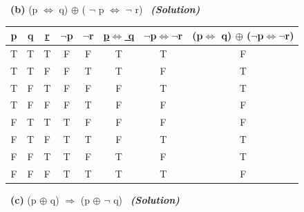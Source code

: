 \documentclass[a4 paper]{article}
\numberwithin{equation}{section}
\newcommand{\subproblem}[1]{~\newline\textbf{(#1)}}
\newcommand{\solution}{~\newline\textbf{\textit{(Solution)}} }
\newcommand{\0}{\mathbf{0}}
\begin{document}
\subproblem{b} (p $\iff$ q) $\oplus$ ( $\neg$ p $\iff$ $\neg$ r)
\solution 
\begin{table}[h!]
\begin{tabular}{cccccccc}
\textbf{p} & \textbf{q} & {\ul \textbf{r}} & \textbf{$\neg$p} & \textbf{$\neg$r} & {\ul \textbf{p$\iff$ q}} & \textbf{$\neg$p$\iff$$\neg$r} & \textbf{(p$\iff$ q) $\oplus$ ($\neg$p$\iff$$\neg$r)} \\ \hline
T          & T          & T                & F                & F                & T                        & T                             & F                                                  \\
T          & T          & F                & F                & T                & T                        & F                             & T                                                  \\
T          & F          & T                & F                & F                & F                        & T                             & T                                                  \\
T          & F          & F                & F                & T                & F                        & F                             & F                                                  \\
F          & T          & T                & T                & F                & F                        & F                             & F                                                  \\
F          & T          & F                & T                & T                & F                        & T                             & T                                                  \\
F          & F          & T                & T                & F                & T                        & F                             & T                                                  \\
F          & F          & F                & T                & T                & T                        & T                             & F                                                 
\end{tabular}
\end{table}



\subproblem{c} (p $\oplus$ q) $\Rightarrow$ (p $\oplus$ $\neg$ q)
\solution
\end{document}
